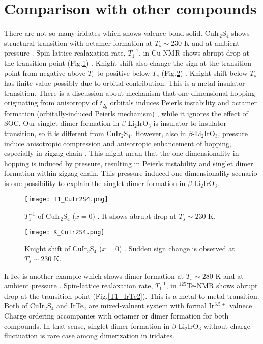 \section{Comparison with other compounds}
There are not so many iridates which shows valence bond solid.
CuIr$_2$S$_4$ shows structural transition with octamer formation at $T_s \sim 230$ K and at ambient pressure \cite{Radaelli2002}.
Spin-lattice realaxation rate, $T^{-1}_1$, in Cu-NMR shows abrupt drop at the transition point (Fig.\ref{T1_CuIr2S4}) \cite{Tsuji1997}.
Knight shift also change the sign at the transition point from negative above $T_s$  to positive below $T_s$ (Fig.\ref{K_CuIr2S4}) \cite{Tsuji1997}.
Knight shift below $T_s$ has finite value possibly due to orbital contribution.
This is a metal-insulator transition.
There is a discussion about mechanism that one-dimensional hopping originating from anisotropy of $t_{2g}$ orbitals induces Peierls instability and octamer formation
(orbitally-induced Peierls mechanism) \cite{Khomskii2005}, while it ignores the effect of SOC.
Our singlet dimer formation in $\beta$-Li$_2$IrO$_3$ is insulator-to-insulator transition, so it is different from CuIr$_2$S$_4$.
However, also in $\beta$-Li$_2$IrO$_3$, pressure induce anisotropic compression and anisotropic enhancement of hopping, especially in zigzag chain
\cite{takayama2018pressure, veiga2017pressure, Kim2016}.
This might mean that the one-dimensionality in hopping is induced by pressure, resulting in Peierls instability and singlet dimer formation within zigzag chain.
This pressure-induced one-dimensionality scenario is one possibility to explain the singlet dimer formation in $\beta$-Li$_2$IrO$_3$.

\begin{figure}
  \centering
  \texttt{[image: T1\_CuIr2S4.png]}
  \caption{$T^{-1}_1$ of CuIr$_2$S$_4$ ($x = 0$) \cite{Tsuji1997}. It shows abrupt drop at $T_s \sim 230$ K.}
  \label{T1_CuIr2S4}
\end{figure}

\begin{figure}
  \centering
  \texttt{[image: K\_CuIr2S4.png]}
  \caption{Knight shift of CuIr$_2$S$_4$ ($x = 0$) \cite{Tsuji1997}. Sudden sign change is observed at $T_s \sim 230$ K.}
  \label{K_CuIr2S4}
\end{figure}

IrTe$_2$ is another example which shows dimer formation at $T_s \sim 280$ K and at ambient pressure \cite{Pascut2014}.
Spin-lattice realaxation rate, $T^{-1}_1$, in ${}^{125}$Te-NMR shows abrupt drop at the transition point (Fig.\ref{T1_IrTe2}).
This is a metal-to-metal transition.
Both of CuIr$_2$S$_4$ and IrTe$_2$ are mixed-valnent system with formal Ir$^{3.5+}$ valnece \cite{Radaelli2002, Pascut2014}.
Charge ordering accompanies with octamer or dimer formation for both compounds.
In that sense, singlet dimer formation in $\beta$-Li$_2$IrO$_3$ without charge fluctuation is rare case among dimerization in iridates.

